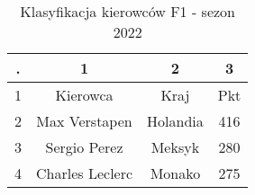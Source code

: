\begin{table}[htbp]
\centering
\begin{tabular}{||c c c c||} 
 \hline
 . & 1 & 2 & 3 \\ [0.5ex] 
 \hline\hline
 1 & Kierowca & Kraj & Pkt \\ 
 \hline
 2 & Max Verstapen & Holandia & 416  \\
 \hline
 3 & Sergio Perez & Meksyk & 280 \\
 \hline
 4 & Charles Leclerc & Monako & 275 \\
 \hline

 \hline
\end{tabular}
\label{tab:losowki}
\caption{Klasyfikacja kierowców F1 - sezon 2022}
\end{table}